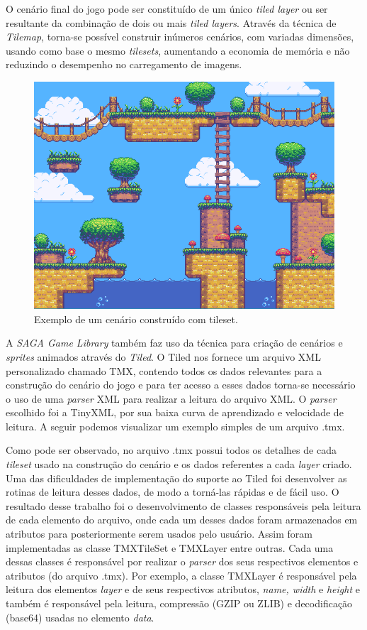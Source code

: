 %
\par
O cenário final do jogo pode ser constituído de um único \textit{tiled layer} ou ser resultante da combinação 
de dois ou mais \textit{tiled layers}. Através da técnica de \textit{Tilemap}, torna-se possível construir inúmeros cenários,
com variadas dimensões, usando como base o mesmo \textit{tilesets}, aumentando a economia de memória e não reduzindo o desempenho 
no carregamento de imagens.
%
%
%
\begin{figure}[H]
    \centering
    \includegraphics[scale = 0.65]{Imagens/cenario.png}
    \caption{Exemplo de um cenário construído com tileset.}
    \label{cenario}
\end{figure}
%
%
%
%
\par 
A \textit{SAGA Game Library} também faz uso da técnica para criação de cenários e \textit{sprites} animados através do \textit{Tiled}. O Tiled nos fornece um arquivo XML personalizado chamado TMX, contendo todos os dados relevantes para a construção do cenário do jogo e para ter acesso a esses dados torna-se necessário o uso de uma \textit{parser} XML para realizar a leitura do arquivo XML. O \textit{parser} escolhido foi a TinyXML, por sua baixa curva de aprendizado e velocidade de leitura. A seguir podemos visualizar um exemplo simples de um arquivo .tmx.
%
%

%
\par 
Como pode ser observado, no arquivo .tmx possui todos os detalhes de cada \textit{tileset} usado na construção do cenário e os dados referentes a cada \textit{layer} criado. Uma das dificuldades de implementação do suporte ao Tiled foi desenvolver as rotinas de leitura desses dados, de modo a torná-las rápidas e de fácil uso. O resultado desse trabalho foi o desenvolvimento de classes responsáveis pela leitura de cada elemento do arquivo, onde cada um desses dados foram armazenados em atributos para posteriormente serem usados pelo usuário. Assim foram implementadas as classe TMXTileSet e TMXLayer entre outras. Cada uma dessas classes é responsável por realizar o \textit{parser} dos seus respectivos elementos e atributos (do arquivo .tmx). Por exemplo, a classe TMXLayer é responsável pela leitura dos elementos \textit{layer} e de seus respectivos atributos, \textit{name, width} e \textit{height} e também é responsável pela leitura, compressão (GZIP ou ZLIB) e decodificação (base64) usadas no elemento \textit{data}.
